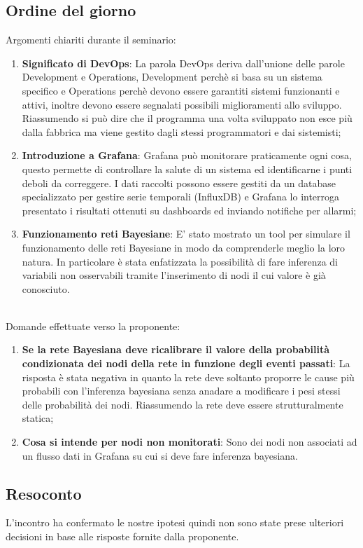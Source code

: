 \documentclass{article}
\begin{document}
    \subsection{Ordine del giorno}
    Argomenti chiariti durante il seminario:
    \begin{enumerate}
        \item \textbf{Significato di DevOps}: La parola DevOps deriva dall'unione delle parole Development e Operations, Development perchè si basa su un sistema specifico e Operations perchè devono essere garantiti sistemi funzionanti e attivi, inoltre devono essere segnalati possibili miglioramenti allo sviluppo. Riassumendo si può dire che il programma una volta sviluppato non esce più dalla fabbrica ma viene gestito dagli stessi programmatori e dai sistemisti;
        \item \textbf{Introduzione a Grafana}: Grafana può monitorare praticamente ogni cosa, questo permette di controllare la salute di un sistema ed identificarne i punti deboli da correggere. I dati raccolti possono essere gestiti da un database specializzato per gestire serie temporali (InfluxDB) e Grafana lo interroga presentato i risultati ottenuti su dashboards ed inviando notifiche per allarmi;
        \item \textbf{Funzionamento reti Bayesiane}: E' stato mostrato un tool per simulare il funzionamento delle reti Bayesiane in modo da comprenderle meglio la loro natura. In particolare è stata enfatizzata la possibilità di fare inferenza di variabili non osservabili tramite l'inserimento di nodi il cui valore è già conosciuto.
    \end{enumerate}
    \\
    Domande effettuate verso la proponente:
    \begin{enumerate}
        \item \textbf{Se la rete Bayesiana deve ricalibrare il valore della probabilità condizionata dei nodi della rete in funzione degli eventi passati}: La risposta è stata negativa in quanto la rete deve soltanto proporre le cause più probabili con l'inferenza bayesiana senza anadare a modificare i pesi stessi delle probabilità dei nodi. Riassumendo la rete deve essere strutturalmente statica;
        \item \textbf{Cosa si intende per nodi non monitorati}: Sono dei nodi non associati ad un flusso dati in Grafana su cui si deve fare inferenza bayesiana.
    \end{enumerate}
    \subsection{Resoconto}
    L'incontro ha confermato le nostre ipotesi quindi non sono state prese ulteriori decisioni in base alle risposte fornite dalla proponente.
    
\end{document}
